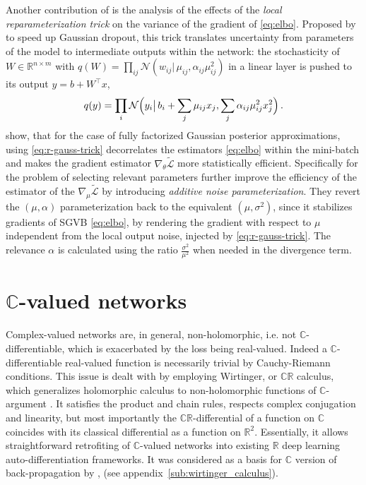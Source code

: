 \documentclass[a4paper,10pt,onecolumn]{article}
\newcommand{\real}{\mathbb{R}}
\newcommand{\cplx}{\mathbb{C}}
\newcommand{\important}[1]{\textbf{\!\colorbox{red}{#1}\!}}
\newcommand{\todo}[1]{{\color{blue} [TODO]} \important{#1}}
\begin{document}
Another contribution of \citep{kingma_variational_2015} is the analysis of the effects of the
\textit{local reparameterization trick} on the variance of the gradient of \eqref{eq:elbo}.
Proposed by \citet{wang_fast_2013} to speed up Gaussian dropout, this trick translates
uncertainty from parameters of the model to intermediate outputs within the network:
the stochasticity of $
  W \in \mathbb{R}^{n\times m}
$ with $
  q(W) = \prod_{ij}
    \mathcal{N}(w_{ij}\vert\, \mu_{ij}, \alpha_{ij} \mu_{ij}^2)
$ in a linear layer is pushed to its output $
  y = b + W^\top x
$,
\begin{equation}  \label{eq:r-gauss-trick}
  q(y) = \prod_i \mathcal{N}\Bigl(
        y_i \big\vert\,
        b_i + \sum_j \mu_{ij} x_j,
        \sum_j \alpha_{ij} \mu_{ij}^2 x_j^2
    \Bigr)
  \,.
\end{equation}
%
\citet{kingma_variational_2015} show, that for the case of fully factorized Gaussian
posterior approximations, using \eqref{eq:r-gauss-trick} decorrelates the estimators
\eqref{eq:elbo} within the mini-batch and makes the gradient estimator $
  \nabla_\theta \tilde{\mathcal{L}}
$ more statistically efficient. Specifically for the problem of selecting relevant parameters
\citet{molchanov_variational_2017} further improve the efficiency of the estimator of the $
  \nabla_\mu \tilde{\mathcal{L}}
$ by introducing \textit{additive noise parameterization}. They revert the $(\mu, \alpha)$
parameterization back to the equivalent $(\mu, \sigma^2)$, since it stabilizes gradients
of SGVB \eqref{eq:elbo}, by rendering the gradient with respect to $\mu$ independent from
the local output noise, injected by \eqref{eq:r-gauss-trick}. The relevance $\alpha$ is
calculated using the ratio $
  \tfrac{\sigma^2}{\mu^2}
$ when needed in the divergence term.



\section{$\cplx$-valued networks} %
\label{sec:c_valued_networks}

Complex-valued networks are, in general, non-holomorphic, i.e. not $\cplx$-differentiable, which is
exacerbated by the loss being real-valued. Indeed a $\cplx$-differentiable real-valued function is
necessarily trivial by Cauchy-Riemann conditions. This issue is dealt with by employing Wirtinger,
or $\cplx\real$ calculus, which generalizes holomorphic calculus to non-holomorphic functions
of $\cplx$-argument \citep{adali_complex-valued_2011,boeddeker_computation_2019}. It satisfies
the product and chain rules, respects complex conjugation and linearity, but most importantly the
$\cplx\real$-differential of a function on $\cplx$ coincides with its classical differential as
a function on $\real^2$. Essentially, it allows straightforward retrofiting of $\cplx$-valued
networks into existing $\real$ deep learning auto-differentiation frameworks. It was considered
as a basis for $\cplx$ version of back-propagation by \citet{benvenuto_complex_1992}, (see
appendix~\ref{sub:wirtinger_calculus}).
\end{document}
